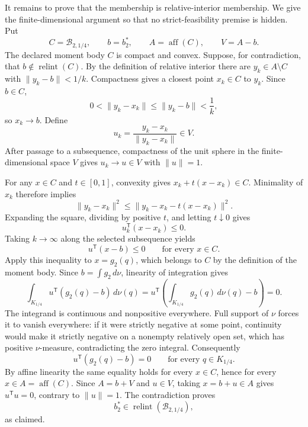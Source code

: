 It remains to prove that the membership is relative-interior membership.  We give the finite-dimensional argument so that no strict-feasibility premise is hidden.  Put
\[
C=\mathcal B_{2,1/4},\qquad b=b_2^*,\qquad A=\operatorname{aff}(C),\qquad V=A-b.
\]
The declared moment body \(C\) is compact and convex.  Suppose, for contradiction, that \(b\notin\operatorname{relint}(C)\).  By the definition of relative interior there are \(y_k\in A\setminus C\) with \(\lVert y_k-b\rVert<1/k\).  Compactness gives a closest point \(x_k\in C\) to \(y_k\).  Since \(b\in C\),
\[
0<\lVert y_k-x_k\rVert\le \lVert y_k-b\rVert<\frac1k,
\]
so \(x_k\to b\).  Define
\[
u_k=\frac{y_k-x_k}{\lVert y_k-x_k\rVert}\in V.
\]
After passage to a subsequence, compactness of the unit sphere in the finite-dimensional space \(V\) gives \(u_k\to u\in V\) with \(\lVert u\rVert=1\).

For any \(x\in C\) and \(t\in[0,1]\), convexity gives \(x_k+t(x-x_k)\in C\).  Minimality of \(x_k\) therefore implies
\[
\lVert y_k-x_k\rVert^2
\le
\lVert y_k-x_k-t(x-x_k)\rVert^2.
\]
Expanding the square, dividing by positive \(t\), and letting \(t\downarrow0\) gives
\[
u_k^{\mathsf T}(x-x_k)\le0.
\]
Taking \(k\to\infty\) along the selected subsequence yields
\[
u^{\mathsf T}(x-b)\le0\qquad\text{for every }x\in C.
\]
Apply this inequality to \(x=g_2(q)\), which belongs to \(C\) by the definition of the moment body.  Since \(b=\int g_2\,d\nu\), linearity of integration gives
\[
\int_{K_{1/4}}u^{\mathsf T}(g_2(q)-b)\,d\nu(q)
=u^{\mathsf T}\left(\int_{K_{1/4}}g_2(q)\,d\nu(q)-b\right)
=0.
\]
The integrand is continuous and nonpositive everywhere.  Full support of \(\nu\) forces it to vanish everywhere: if it were strictly negative at some point, continuity would make it strictly negative on a nonempty relatively open set, which has positive \(\nu\)-measure, contradicting the zero integral.  Consequently
\[
u^{\mathsf T}(g_2(q)-b)=0\qquad\text{for every }q\in K_{1/4}.
\]
By affine linearity the same equality holds for every \(x\in C\), hence for every \(x\in A=\operatorname{aff}(C)\).  Since \(A=b+V\) and \(u\in V\), taking \(x=b+u\in A\) gives \(u^{\mathsf T}u=0\), contrary to \(\lVert u\rVert=1\).  The contradiction proves
\[
b_2^*\in\operatorname{relint}(\mathcal B_{2,1/4}),
\]
as claimed.
